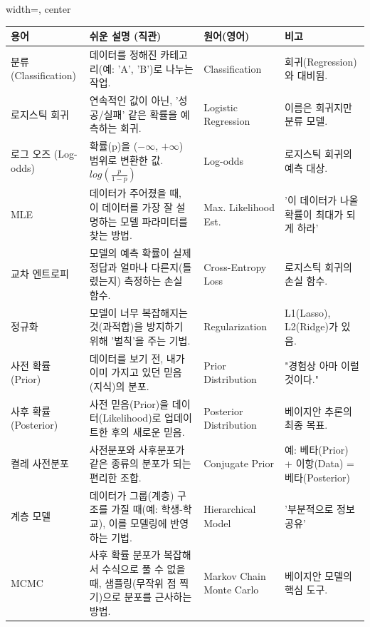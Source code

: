 \documentclass[11pt,a4paper]{book}
\theoremstyle{definition}
\begin{document}
\begin{adjustbox}{width=\textwidth, center}
\begin{tabular}{lp{6cm}p{4cm}p{3cm}}
\toprule
\textbf{용어} & \textbf{쉬운 설명 (직관)} & \textbf{원어(영어)} & \textbf{비고} \\
\midrule
분류 (Classification) & 데이터를 정해진 카테고리(예: 'A', 'B')로 나누는 작업. & Classification & 회귀(Regression)와 대비됨. \\
로지스틱 회귀 & 연속적인 값이 아닌, '성공/실패' 같은 확률을 예측하는 회귀. & Logistic Regression & 이름은 회귀지만 분류 모델. \\
로그 오즈 (Log-odds) & 확률(p)을 ($-\infty$, $+\infty$) 범위로 변환한 값. $log(\frac{p}{1-p})$ & Log-odds & 로지스틱 회귀의 예측 대상. \\
MLE & 데이터가 주어졌을 때, 이 데이터를 가장 잘 설명하는 모델 파라미터를 찾는 방법. & Max. Likelihood Est. & '이 데이터가 나올 확률이 최대가 되게 하라' \\
교차 엔트로피 & 모델의 예측 확률이 실제 정답과 얼마나 다른지(틀렸는지) 측정하는 손실 함수. & Cross-Entropy Loss & 로지스틱 회귀의 손실 함수. \\
정규화 & 모델이 너무 복잡해지는 것(과적합)을 방지하기 위해 '벌칙'을 주는 기법. & Regularization & L1(Lasso), L2(Ridge)가 있음. \\
사전 확률 (Prior) & 데이터를 보기 전, 내가 이미 가지고 있던 믿음(지식)의 분포. & Prior Distribution & "경험상 아마 이럴 것이다." \\
사후 확률 (Posterior) & 사전 믿음(Prior)을 데이터(Likelihood)로 업데이트한 후의 새로운 믿음. & Posterior Distribution & 베이지안 추론의 최종 목표. \\
켤레 사전분포 & 사전분포와 사후분포가 같은 종류의 분포가 되는 편리한 조합. & Conjugate Prior & 예: 베타(Prior) + 이항(Data) = 베타(Posterior) \\
계층 모델 & 데이터가 그룹(계층) 구조를 가질 때(예: 학생-학교), 이를 모델링에 반영하는 기법. & Hierarchical Model & '부분적으로 정보 공유' \\
MCMC & 사후 확률 분포가 복잡해서 수식으로 풀 수 없을 때, 샘플링(무작위 점 찍기)으로 분포를 근사하는 방법. & Markov Chain Monte Carlo & 베이지안 모델의 핵심 도구. \\
\bottomrule
\end{tabular}
\end{adjustbox}


\end{document}
